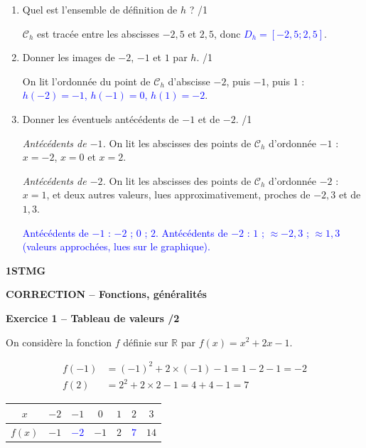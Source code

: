 \documentclass[10pt,a4paper]{article}
\renewcommand{\niveau}{1STMG}
\renewcommand{\chapitre}{Fonctions, généralités}
\renewcommand{\interroversion}[1]{
    \noindent\textbf{\niveau}

    \vspace{-0.5cm}
    \begin{center}
        \textbf{\large CORRECTION -- \chapitre}
    \end{center}

    \vspace{0.1cm}
}
\begin{document}
\begin{enumerate}
    \item Quel est l'ensemble de définition de \(h\) ? \hfill /1

    \(\mathcal{C}_h\) est tracée entre les abscisses \(-2{,}5\) et \(2{,}5\), donc \textcolor{blue}{\(D_h=[-2{,}5;2{,}5]\)}.
    \item Donner les images de \(-2\), \(-1\) et \(1\) par \(h\). \hfill /1

    On lit l'ordonnée du point de \(\mathcal{C}_h\) d'abscisse \(-2\), puis \(-1\), puis \(1\) :
    \textcolor{blue}{\(h(-2)=-1\), \(h(-1)=0\), \(h(1)=-2\)}.
    \item Donner les éventuels antécédents de \(-1\) et de \(-2\). \hfill /1

    \emph{Antécédents de \(-1\).} On lit les abscisses des points de \(\mathcal{C}_h\) d'ordonnée \(-1\) : \(x=-2\), \(x=0\) et \(x=2\).

    \emph{Antécédents de \(-2\).} On lit les abscisses des points de \(\mathcal{C}_h\) d'ordonnée \(-2\) : \(x=1\), et deux autres valeurs, lues approximativement, proches de \(-2{,}3\) et de \(1{,}3\).

    \textcolor{blue}{Antécédents de \(-1\) : \(-2\) ; \(0\) ; \(2\). Antécédents de \(-2\) : \(1\) ; \(\approx-2{,}3\) ; \(\approx1{,}3\) (valeurs approchées, lues sur le graphique).}
\end{enumerate}

\newpage


\interroversion{D}

\textbf{Exercice 1 -- Tableau de valeurs \hfill /2}

On considère la fonction \(f\) définie sur \(\mathbb{R}\) par \(f(x)=x^2+2x-1\).

\[
\begin{aligned}
f(-1) &= (-1)^2+2\times(-1)-1 = 1-2-1 = -2\\
f(2)  &= 2^2+2\times 2-1 = 4+4-1 = 7
\end{aligned}
\]

\begin{center}
    \renewcommand{\arraystretch}{1.5}
    \setlength{\tabcolsep}{0.25cm}
    \begin{tabular}{|*{7}{c|}}
    \hline
    \(x\) & \(-2\) & \(-1\) & \(0\) & \(1\) & \(2\) & \(3\) \\
    \hline
    \(f(x)\) & \(-1\) & \textcolor{blue}{\(-2\)} & \(-1\) & \(2\) & \textcolor{blue}{\(7\)} & \(14\) \\
    \hline
    \end{tabular}
\end{center}
\end{document}
